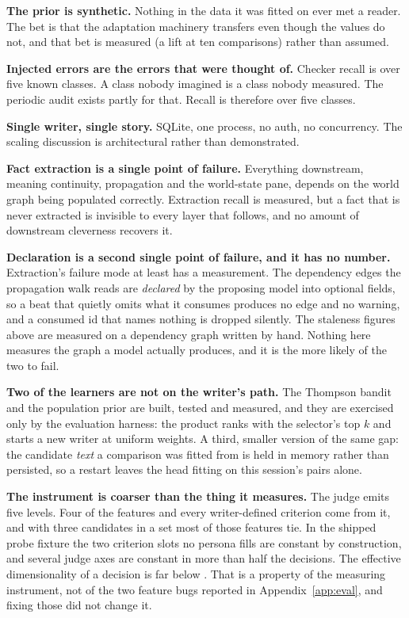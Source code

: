 \documentclass{article}
\begin{document}
\textbf{The prior is synthetic.} Nothing in the data it was fitted on ever met a reader. The
bet is that the adaptation machinery transfers even though the values do not, and that bet is
measured (a \rLiftAtTen{} lift at ten comparisons) rather than assumed.

\textbf{Injected errors are the errors that were thought of.} Checker recall is over five known
classes. A class nobody imagined is a class nobody measured. The periodic audit exists partly for that. Recall is therefore over five classes.

\textbf{Single writer, single story.} SQLite, one process, no auth, no concurrency. The
scaling discussion is architectural rather than demonstrated.

\textbf{Fact extraction is a single point of failure.} Everything downstream, meaning continuity,
propagation and the world-state pane, depends on the world graph being populated correctly.
Extraction recall is measured, but a fact that is never extracted is invisible to every layer
that follows, and no amount of downstream cleverness recovers it.

\textbf{Declaration is a second single point of failure, and it has no number.} Extraction's
failure mode at least has a measurement. The dependency edges the propagation walk reads are
\emph{declared} by the proposing model into optional fields, so a beat that quietly omits
what it consumes produces no edge and no warning, and a consumed id that names nothing is
dropped silently. The staleness figures above are measured on a dependency graph written by
hand. Nothing here measures the graph a model actually produces, and it is the more likely
of the two to fail.

\textbf{Two of the learners are not on the writer's path.} The Thompson bandit and the
population prior are built, tested and measured, and they are exercised only by the
evaluation harness: the product ranks with the selector's top $k$ and starts a new writer at
uniform weights. A third, smaller version of the same gap: the candidate \emph{text} a
comparison was fitted from is held in memory rather than persisted, so a restart leaves the
head fitting on this session's pairs alone.

\textbf{The instrument is coarser than the thing it measures.} The judge emits five levels.
Four of the \rFeatures{} features and every writer-defined criterion come from it, and with
three candidates in a set most of those features tie. In the shipped probe fixture the two
criterion slots no persona fills are constant by construction, and several judge axes are
constant in more than half the decisions. The effective dimensionality of a decision is far
below \rFeatures{}. That is a property of the measuring instrument, not of the two feature
bugs reported in Appendix~\ref{app:eval}, and fixing those did not change it.
\end{document}
